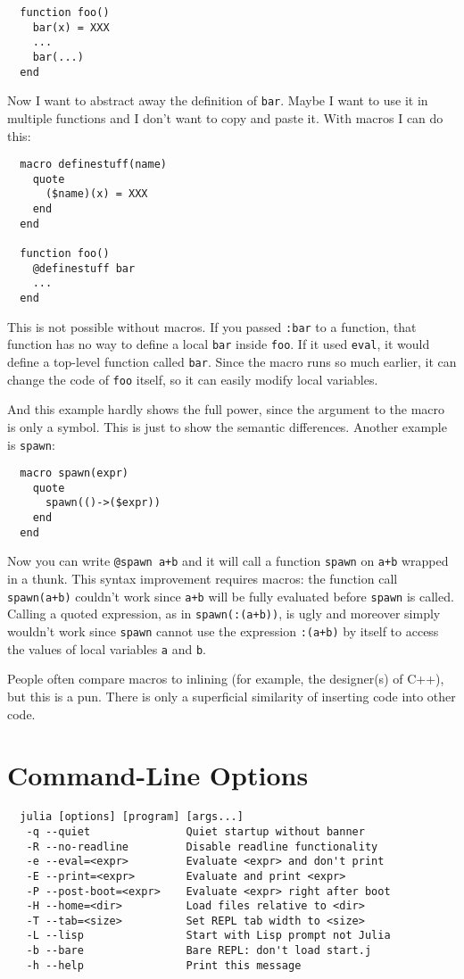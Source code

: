 \documentclass{article}
\renewcommand{\sec}[1]{\label{sec:#1}}
\begin{document}
\begin{verbatim}
  function foo()
    bar(x) = XXX
    ...
    bar(...)
  end
\end{verbatim}

Now I want to abstract away the definition of \verb|bar|.
Maybe I want to use it in multiple functions and I don't want to copy and paste it.
With macros I can do this:

\begin{verbatim}
  macro definestuff(name)
    quote
      ($name)(x) = XXX
    end
  end

  function foo()
    @definestuff bar
    ...
  end
\end{verbatim}

This is not possible without macros.
If you passed \verb|:bar| to a function, that function has no way to define a local \verb|bar| inside \verb|foo|.
If it used \verb|eval|, it would define a top-level function called \verb|bar|. 
Since the macro runs so much earlier, it can change the code of \verb|foo| itself, so it can easily modify local variables.

And this example hardly shows the full power, since the argument to
the macro is only a symbol.
This is just to show the semantic differences.
Another example is \verb|spawn|:

\begin{verbatim}
  macro spawn(expr)
    quote
      spawn(()->($expr))
    end
  end
\end{verbatim}

Now you can write \verb|@spawn a+b| and it will call a function \verb|spawn| on \verb|a+b| wrapped in a thunk.
This syntax improvement requires macros:
the function call \verb|spawn(a+b)| couldn't work since \verb|a+b| will be fully evaluated before \verb|spawn| is called.
Calling a quoted expression, as in \verb|spawn(:(a+b))|, is ugly and moreover simply wouldn't work since \verb|spawn| cannot use the expression \verb|:(a+b)| by itself to access the values of local variables \verb|a| and \verb|b|.

People often compare macros to inlining (for example, the designer(s) of C++), but this is a pun.
There is only a superficial similarity of inserting code into other code.

\section{Command-Line Options}
\sec{command-line-options}

\begin{verbatim}
  julia [options] [program] [args...]
   -q --quiet               Quiet startup without banner
   -R --no-readline         Disable readline functionality
   -e --eval=<expr>         Evaluate <expr> and don't print
   -E --print=<expr>        Evaluate and print <expr>
   -P --post-boot=<expr>    Evaluate <expr> right after boot
   -H --home=<dir>          Load files relative to <dir>
   -T --tab=<size>          Set REPL tab width to <size>
   -L --lisp                Start with Lisp prompt not Julia
   -b --bare                Bare REPL: don't load start.j
   -h --help                Print this message
\end{verbatim}
\end{document}
